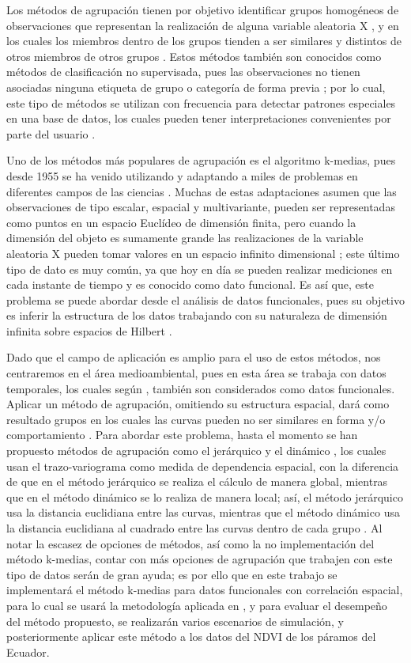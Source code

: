 \documentclass[
]{book}
\begin{document}
Los métodos de agrupación tienen por objetivo identificar grupos homogéneos de observaciones que representan la realización de alguna variable aleatoria X \citep{Jaque}, y en los cuales los miembros dentro de los grupos tienden a ser similares y distintos de otros miembros de otros grupos \citep{Romano}. Estos métodos también son conocidos como métodos de clasificación no supervisada, pues las observaciones no tienen asociadas ninguna etiqueta de grupo o categoría de forma previa \citep{Jain}; por lo cual, este tipo de métodos se utilizan con frecuencia para detectar patrones especiales en una base de datos, los cuales pueden tener interpretaciones convenientes por parte del usuario \citep{Jaque}.

Uno de los métodos más populares de agrupación es el algoritmo k-medias, pues desde 1955 se ha venido utilizando y adaptando a miles de problemas en diferentes campos de las ciencias \citep{Jain}. Muchas de estas adaptaciones asumen que las observaciones de tipo escalar, espacial y multivariante, pueden ser representadas como puntos en un espacio Euclídeo de dimensión finita, pero cuando la dimensión del objeto es sumamente grande las realizaciones de la variable aleatoria X pueden tomar valores en un espacio infinito dimensional \citep{Jaque}; este último tipo de dato es muy común, ya que hoy en día se pueden realizar mediciones en cada instante de tiempo y es conocido como dato funcional. Es así que, este problema se puede abordar desde el análisis de datos funcionales, pues su objetivo es inferir la estructura de los datos trabajando con su naturaleza de dimensión infinita sobre espacios de Hilbert \citep{Luz}.

Dado que el campo de aplicación es amplio para el uso de estos métodos, nos centraremos en el área medioambiental, pues en esta área se trabaja con datos temporales, los cuales según \citep{Elvira}, también son considerados como datos funcionales. Aplicar un método de agrupación, omitiendo su estructura espacial, dará como resultado grupos en los cuales las curvas pueden no ser similares en forma y/o comportamiento \citep{Elvira}. Para abordar este problema, hasta el momento se han propuesto métodos de agrupación como el jerárquico \citep{Hclust} y el dinámico \citep{Elvira}, los cuales usan el trazo-variograma como medida de dependencia espacial, con la diferencia de que en el método jerárquico se realiza el cálculo de manera global, mientras que en el método dinámico se lo realiza de manera local; así, el método jerárquico usa la distancia euclidiana entre las curvas, mientras que el método dinámico usa la distancia euclidiana al cuadrado entre las curvas dentro de cada grupo \citep{Romano}. Al notar la escasez de opciones de métodos, así como la no implementación del método k-medias, contar con más opciones de agrupación que trabajen con este tipo de datos serán de gran ayuda; es por ello que en este trabajo se implementará el método k-medias para datos funcionales con correlación espacial, para lo cual se usará la metodología aplicada en \citep{Hclust}, y para evaluar el desempeño del método propuesto, se realizarán varios escenarios de simulación, y posteriormente aplicar este método a los datos del NDVI de los páramos del Ecuador.
\end{document}
